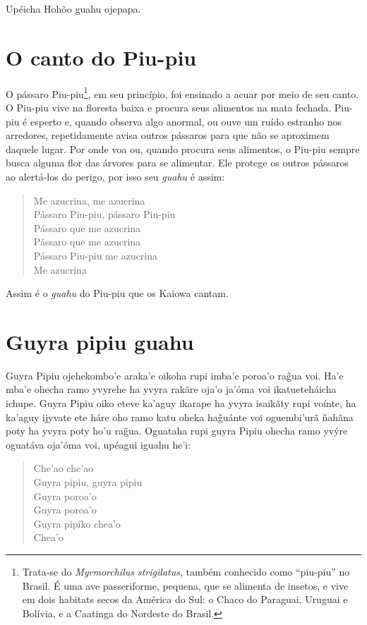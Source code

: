 Upéicha Hohõo guahu ojepapa.

\chapter{O canto do Piu-piu}

O pássaro Piu-piu\footnote{Trata-se do \emph{Myrmorchilus strigilatus},
  também conhecido como ``piu-piu'' no Brasil. É uma ave passeriforme,
  pequena, que se alimenta de insetos, e vive em dois habitats secos da
  América do Sul: o Chaco do Paraguai, Uruguai e Bolívia, e a Caatinga
  do Nordeste do Brasil.}, em seu princípio, foi ensinado a acuar por
meio de seu canto. O Piu-piu vive na floresta baixa e procura seus
alimentos na mata fechada. Piu-piu é esperto e, quando observa algo
anormal, ou ouve um ruído estranho nos arredores, repetidamente avisa
outros pássaros para que não se aproximem daquele lugar. Por onde voa
ou, quando procura seus alimentos, o Piu-piu sempre busca alguma flor
das árvores para se alimentar. Ele protege os outros pássaros ao
alertá-los do perigo, por isso seu \emph{guahu} é assim:

\begin{verse}
Me azucrina, me azucrina\\
Pássaro Piu-piu, pássaro Piu-piu\\
Pássaro que me azucrina\\
Pássaro que me azucrina\\
Pássaro Piu-piu me azucrina\\
Me azucrina
\end{verse}

Assim é o \emph{guahu} do Piu-piu que os Kaiowa cantam.

\chapter{Guyra pipiu guahu}

Guyra Pipiu ojehekombo'e araka'e oikoha rupi imba'e poroa'o rag̃ua voi.
Ha'e mba'e ohecha ramo yvyrehe ha yvyra rakãre oja'o ja'óma voi
ikatueteháicha ichupe. Guyra Pipiu oiko eteve ka'aguy ikarape ha yvyra
isaikãty rupi voínte, ha ka'aguy ijyvate ete háre oho ramo katu oheka
hag̃uánte voi oguembi'urã ñahãna poty ha yvyra poty ho'u rag̃ua. Oguataha
rupi guyra Pipiu ohecha ramo yvýre oguatáva oja'óma voi, upéagui iguahu
he'i:


\begin{verse}
Che'ao che'ao\\
Guyra pipiu, guyra pipiu\\
Guyra poroa'o\\
Guyra poroa'o\\
Guyra pipíko chea'o\\
Chea'o
\end{verse}

